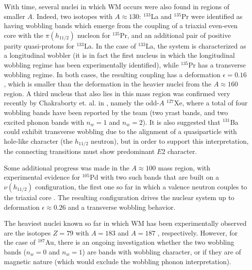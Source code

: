 \documentclass[11pt]{article}
\begin{document}
With time, several nuclei in which WM occurs were also found in regions of smaller $A$. Indeed, two isotopes with $A\approx130$: $^{133}$La \cite{biswas2019longitudinal} and $^{135}$Pr \cite{matta2017transverse,sensharma2019two} were identified as having wobbling bands which emerge from the coupling of a triaxial even-even core with the $\pi(h_{11/2})$ nucleon for $^{135}$Pr, and an additional pair of positive parity quasi-protons for $^{133}$La. In the case of $^{133}$La, the system is characterized as a longitudinal wobbler (it is in fact the first nucleus in which the longitudinal wobbling regime has been experimentally identified), while $^{135}$Pr has a transverse wobbling regime. In both cases, the resulting coupling has a deformation $\epsilon=0.16$ \cite{matta2017transverse,biswas2019longitudinal}, which is smaller than the deformation in the heavier nuclei from the $A\approx160$ region. A third nucleus that also lies in this mass region was confirmed very recently by Chakraborty et. al. in \cite{chakraborty2020multiphonon}, namely the odd-$A$ $^{127}$Xe, where a total of four wobbling bands have been reported by the team (two yrast bands, and two excited phonon bands with $n_w=1$ and $n_w=2$). It is also suggested that $^{131}$Ba could exhibit transverse wobbling \cite{ba131} due to the alignment of a quasiparticle with hole-like character (the $h_{11/2}$ neutron), but in order to support this interpretation, the connecting transitions must show predominant $E2$ character.

Some additional progress was made in the $A\approx100$ mass region, with experimental evidence for $^{105}$Pd with two such bands that are built on a $\nu(h_{11/2})$ configuration, the first one so far in which a valence neutron couples to the triaxial core \cite{timar2019experimental}. The resulting configuration drives the nuclear system up to deformation $\epsilon\approx0.26$ and a transverse wobbling behavior.

The heaviest nuclei known so far in which WM has been experimentally observed are the isotopes $Z=79$ with $A=183$ \cite{nandi2020first} and $A=187$ \cite{sensharma2020longitudinal}, respectively. However, for the case of $^{187}$Au, there is an ongoing investigation \cite{guo2020risk} whether the two wobbling bands ($n_w=0$ and $n_w=1$) are bands with wobbling character, or if they are of magnetic nature (which would exclude the wobbling phonon interpretation).
\end{document}
